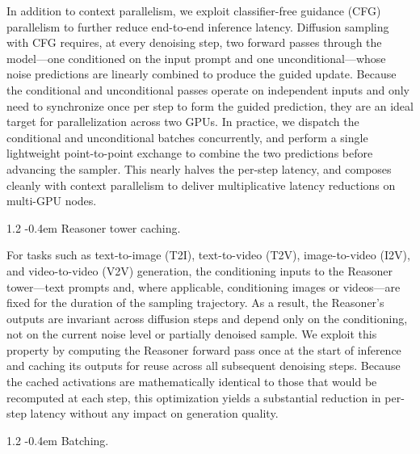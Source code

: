\documentclass{llmxive}
\makeatletter
\providecommand{\paragraph}{  \@startsection{paragraph}{4}{\z@}    {1\baselineskip \@plus .2\baselineskip}    {-0.4em}    {\normalfont\normalsize\bfseries}}
\makeatother
\begin{document}
In addition to context parallelism, we exploit classifier-free guidance (CFG) parallelism to further reduce end-to-end inference latency. Diffusion sampling with CFG requires, at every denoising step, two forward passes through the model---one conditioned on the input prompt and one unconditional---whose noise predictions are linearly combined to produce the guided update. Because the conditional and unconditional passes operate on independent inputs and only need to synchronize once per step to form the guided prediction, they are an ideal target for parallelization across two GPUs. In practice, we dispatch the conditional and unconditional batches concurrently, and perform a single lightweight point-to-point exchange to combine the two predictions before advancing the sampler. This nearly halves the per-step latency, and composes cleanly with context parallelism to deliver multiplicative latency reductions on multi-GPU nodes.

\paragraph{Reasoner tower caching.}

For tasks such as text-to-image (T2I), text-to-video (T2V), image-to-video (I2V), and video-to-video (V2V) generation, the conditioning inputs to the Reasoner tower---text prompts and, where applicable, conditioning images or videos---are fixed for the duration of the sampling trajectory. As a result, the Reasoner's outputs are invariant across diffusion steps and depend only on the conditioning, not on the current noise level or partially denoised sample. We exploit this property by computing the Reasoner forward pass once at the start of inference and caching its outputs for reuse across all subsequent denoising steps. Because the cached activations are mathematically identical to those that would be recomputed at each step, this optimization yields a substantial reduction in per-step latency without any impact on generation quality.

\paragraph{Batching.}
\end{document}
